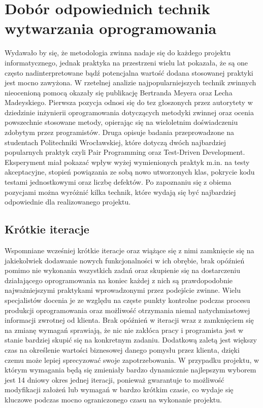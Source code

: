\section{Dobór odpowiednich technik wytwarzania oprogramowania}
\label{sec:doborTechnikWytwarzania}

Wydawało by się, że metodologia zwinna nadaje się do każdego projektu
informatycznego, jednak praktyka na przestrzeni wielu lat pokazała, że są one często
nadinterpretowane bądź potencjalna wartość dodana stosowanej praktyki jest mocno
zawyżona. W rzetelnej analizie najpopularniejszych technik zwinnych nieocenioną pomocą
okazały się publikację Bertranda Meyera oraz Lecha Madeyskiego. Pierwsza pozycja odnosi się do tez głoszonych przez
autorytety w dziedzinie inżynierii oprogramowania dotyczących metodyki zwinnej oraz ocenia powszechnie stosowane
metody, opierając się na wieloletnim doświadczeniu zdobytym przez programistów\cite{AGI01}. Druga
opisuje badania przeprowadzone na studentach Politechniki Wrocławskiej, które dotyczą
dwóch najbardziej popularnych praktyk czyli Pair Programming oraz Test-Driven
Development\cite{TDD01}. Eksperyment miał pokazać wpływ wyżej wymienionych praktyk m.in. na testy
akceptacyjne, stopień powiązania ze sobą nowo utworzonych klas, pokrycie kodu testami
jednostkowymi oraz liczbę defektów. Po zapoznaniu się z obiema pozycjami można wyróżnić
kilka technik, które wydają się być najbardziej odpowiednie dla realizowanego projektu.

\subsection{Krótkie iteracje}
\label{subsec:krótkieIteracje}

Wspomniane wcześniej krótkie iteracje oraz wiążące się z nimi zamknięcie się na
jakiekolwiek dodawanie nowych funkcjonalności w ich obrębie, brak opóźnień pomimo nie
wykonania wszystkich zadań oraz skupienie się na dostarczeniu działającego oprogramowania na koniec każdej z nich są prawdopodobnie najważniejszymi praktykami
wprowadzonymi przez podejście zwinne. Wielu specjalistów docenia je ze względu na
częste punkty kontrolne podczas procesu produkcji oprogramowania oraz możliwość
otrzymania niemal natychmiastowej informacji zwrotnej od klienta. Brak opóźnień w iteracji
wraz z zamknięciem się na zmianę wymagań sprawiają, że nic nie zakłóca pracy i programista
jest w stanie bardziej skupić się na konkretnym zadaniu. Dodatkową zaletą jest większy czas na określenie wartości biznesowej danego pomysłu przez klienta, dzięki czemu może
lepiej sprecyzować swoje zapotrzebowania. W przypadku projektu, w którym wymagania będą
się zmieniały bardzo dynamicznie najlepszym wyborem jest 14 dniowy okres jednej iteracji,
ponieważ gwarantuje to możliwość modyfikacji założeń lub wymagań w bardzo krótkim
czasie, co wydaje się kluczowe podczas mocno ograniczonego czasu na wykonanie projektu.

